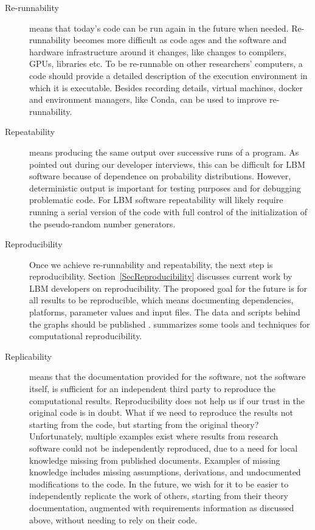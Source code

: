 \documentclass[final, 3p, times, authoryear]{elsarticle}
\begin{document}
\begin{description}

	\item[Re-runnability] means that today's code can be run again in the future
	when needed.  Re-runnability becomes more difficult as code ages and the
	software and hardware infrastructure around it changes, like changes to
	compilers, GPUs, libraries etc.  To be re-runnable on other researchers'
	computers, a code should provide a detailed description of the execution
	environment in which it is executable.  Besides recording details, virtual
	machines, docker and environment managers, like Conda, can be used to
	improve re-runnability.
	
	\item[Repeatability] means producing the same output over successive runs of
	a program.  As pointed out during our developer interviews, this can be
	difficult for LBM software because of dependence on probability
	distributions.  However, deterministic output is important for testing
	purposes and for debugging problematic code.  For LBM software repeatability
	will likely require running a serial version of the code with full control
	of the initialization of the pseudo-random number generators.

	\item[Reproducibility] Once we achieve re-runnability and repeatability, the
	next step is reproducibility.  Section~\ref{SecReproducibility} discusses
	current work by LBM developers on reproducibility.  The proposed goal for
	the future is for all results to be reproducible, which means documenting
	dependencies, platforms, parameter values and input files. The data and
	scripts behind the graphs should be published
	\citep{BenureauAndRougier2017}.  \citet{PiccoloAndFrampton2016} summarizes
	some tools and techniques for computational reproducibility.

	\item[Replicability] means that the documentation provided for the software,
	not the software itself, is sufficient for an independent third party to
	reproduce the computational results.  Reproducibility does not help us if
	our trust in the original code is in doubt.  What if we need to reproduce
	the results not starting from the code, but starting from the original
	theory? Unfortunately, multiple examples exist \citep{CrickAndHall2014,
	IonescuAndJansson2013} where results from research software could not be
	independently reproduced, due to a need for local knowledge missing from
	published documents.  Examples of missing knowledge includes missing
	assumptions, derivations, and undocumented modifications to the code.  In
	the future, we wish for it to be easier to independently replicate the work
	of others, starting from their theory documentation, augmented with
	requirements information as discussed above, without needing to rely on
	their code.

\end{description}
\end{document}
